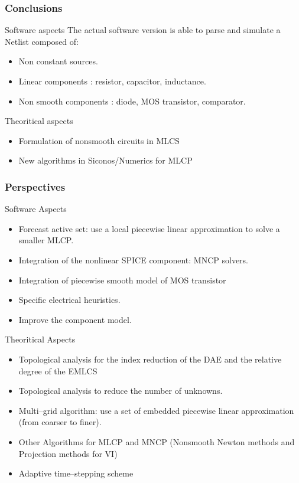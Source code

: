 \frame
{
\frametitle{Conclusions}
\begin{block}{Software aspects}
The actual software version is able to parse and simulate a Netlist composed of:
\begin{itemize}
\item Non constant sources.
\item Linear components : resistor, capacitor, inductance.
\item Non smooth components : diode, MOS  transistor, comparator.
\end{itemize}
\end{block}
\pause
\begin{block}{Theoritical aspects}
\begin{itemize}
\item Formulation of nonsmooth circuits in MLCS
\item New algorithms in Siconos/Numerics for MLCP
\end{itemize}
\end{block}
}

\frame
{
\frametitle{Perspectives}
\begin{block}{Software Aspects}
\begin{itemize}
\item Forecast active set: use a local piecewise linear approximation to solve a smaller MLCP.
\item Integration of the nonlinear SPICE component: MNCP solvers.
\item Integration of piecewise smooth model of MOS transistor
\item Specific electrical heuristics.
\item Improve the component model.
\end{itemize}
\end{block}
\pause
\begin{block}{Theoritical Aspects}
\begin{itemize}
\item Topological analysis for the index reduction of the DAE and the relative degree of the EMLCS
\item Topological analysis to reduce the number of unknowns.
\item Multi--grid algorithm: use a set of embedded piecewise linear approximation (from coarser to finer).
\item Other Algorithms for MLCP and MNCP (Nonsmooth Newton methods and Projection methods for VI)
\item Adaptive time--stepping scheme
\end{itemize}
\end{block}

}

